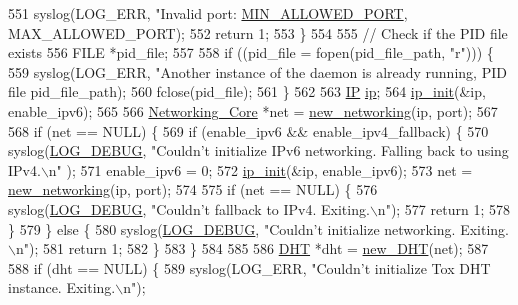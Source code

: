 \begin{DoxyCode}
{{551         syslog(LOG\_ERR, \textcolor{stringliteral}{"Invalid port: %
      \hyperlink{tox-bootstrapd_8c_a3ef213aa33f9321104faf75dfe823623}{MIN\_ALLOWED\_PORT}, MAX\_ALLOWED\_PORT);
552         \textcolor{keywordflow}{return} 1;
553     \}
554 
555     \textcolor{comment}{// Check if the PID file exists}
556     FILE *pid\_file;
557 
558     \textcolor{keywordflow}{if} ((pid\_file = fopen(pid\_file\_path, \textcolor{stringliteral}{"r"}))) \{
559         syslog(LOG\_ERR, \textcolor{stringliteral}{"Another instance of the daemon is already running, PID file %
      pid\_file\_path);
560         fclose(pid\_file);
561     \}
562 
563     \hyperlink{struct_i_p}{IP} \hyperlink{irc__syncbot_8c_ae81515e082f9bc33e8968181945586da}{ip};
564     \hyperlink{network_8c_a6aa0dce9c25e370af93bf4a14f79c709}{ip\_init}(&ip, enable\_ipv6);
565 
566     \hyperlink{struct_networking___core}{Networking\_Core} *net = \hyperlink{network_8c_a0c272a560dd4b2c18c6546a91656c1b5}{new\_networking}(ip, port);
567 
568     \textcolor{keywordflow}{if} (net == NULL) \{
569         \textcolor{keywordflow}{if} (enable\_ipv6 && enable\_ipv4\_fallback) \{
570             syslog(\hyperlink{logger_8h_aa5a9053636a30269210c54e734e0d583ab9f002c6ffbfd511da8090213227454e}{LOG\_DEBUG}, \textcolor{stringliteral}{"Couldn't initialize IPv6 networking. Falling back to using IPv4.\(\backslash\)n"}
      );
571             enable\_ipv6 = 0;
572             \hyperlink{network_8c_a6aa0dce9c25e370af93bf4a14f79c709}{ip\_init}(&ip, enable\_ipv6);
573             net = \hyperlink{network_8c_a0c272a560dd4b2c18c6546a91656c1b5}{new\_networking}(ip, port);
574 
575             \textcolor{keywordflow}{if} (net == NULL) \{
576                 syslog(\hyperlink{logger_8h_aa5a9053636a30269210c54e734e0d583ab9f002c6ffbfd511da8090213227454e}{LOG\_DEBUG}, \textcolor{stringliteral}{"Couldn't fallback to IPv4. Exiting.\(\backslash\)n"});
577                 \textcolor{keywordflow}{return} 1;
578             \}
579         \} \textcolor{keywordflow}{else} \{
580             syslog(\hyperlink{logger_8h_aa5a9053636a30269210c54e734e0d583ab9f002c6ffbfd511da8090213227454e}{LOG\_DEBUG}, \textcolor{stringliteral}{"Couldn't initialize networking. Exiting.\(\backslash\)n"});
581             \textcolor{keywordflow}{return} 1;
582         \}
583     \}
584 
585 
586     \hyperlink{struct_d_h_t}{DHT} *dht = \hyperlink{_d_h_t_8c_adad04fa897751b06948a172044bf1c58}{new\_DHT}(net);
587 
588     \textcolor{keywordflow}{if} (dht == NULL) \{
589         syslog(LOG\_ERR, \textcolor{stringliteral}{"Couldn't initialize Tox DHT instance. Exiting.\(\backslash\)n"});
}}}}
\end{DoxyCode}
